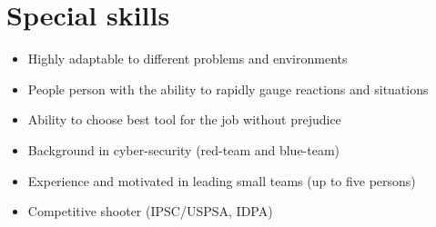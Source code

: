 \documentclass[a4paper]{article}
\begin{document}
\section{Special skills}
\begin{itemize}
    \item Highly adaptable to different problems and environments
    \item People person with the ability to rapidly gauge reactions and situations
    \item Ability to choose best tool for the job without prejudice
    \item Background in cyber-security (red-team and blue-team)
    \item Experience and motivated in leading small teams (up to five persons)
    \item Competitive shooter (IPSC/USPSA, IDPA)
\end{itemize}
\end{document}
